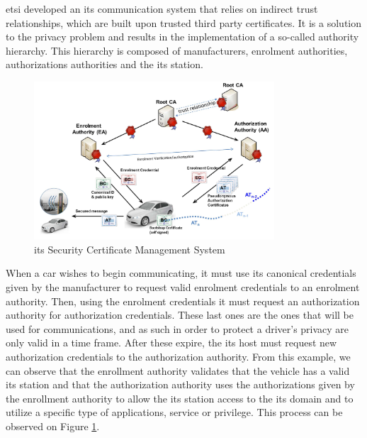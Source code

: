 \gls{etsi} developed an \gls{its} communication system that relies on indirect trust relationships, which are built upon trusted third party certificates. It is a solution to the privacy problem and results in the implementation of a so-called authority hierarchy. This hierarchy is composed of manufacturers, enrolment authorities, authorizations authorities and the \gls{its} station.

\begin{figure}[htbp]
    \centering
    \includegraphics[width=0.8\textwidth]{Chapters/Figures/VANETs/pki.png}
   	\caption{\gls{its} Security Certificate Management System~\cite{etsi_intelligent_2018}}
   	\label{fig:pki}
\end{figure}


When a car wishes to begin communicating, it must use its canonical credentials given by the manufacturer to request valid enrolment credentials to an enrolment authority. Then, using the enrolment credentials it must request an authorization authority for authorization credentials. These last ones are the ones that will be used for communications, and as such in order to protect a driver's privacy are only valid in a time frame. After these expire, the \gls{its} host must request new authorization credentials to the authorization authority.
From this example, we can observe that the enrollment authority validates that the vehicle has a valid \gls{its} station and that the authorization authority uses the authorizations given by the enrollment authority to allow the \gls{its} station access to the \gls{its} domain and to utilize a specific type of applications, service or privilege. This process can be observed on Figure \ref{fig:pki}.
\cite{etsi_intelligent_2021}


